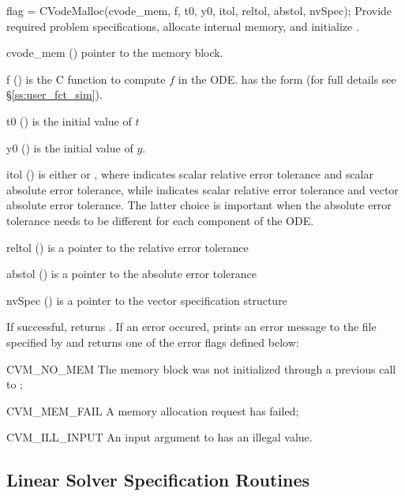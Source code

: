 {
flag = CVodeMalloc(cvode\_mem, f, t0, y0, itol, reltol, abstol, nvSpec);
}
{
  Provide required problem specifications, allocate internal memory,
  and initialize {\cvodes}.
}
{
  \begin{args}[abstol]
  \item[cvode\_mem] ()
    pointer to the {\cvodes} memory block.
  \item[f] ()
    is the C function to compute $f$ in the ODE.  has the form 
     (for full details see \S\ref{ss:user_fct_sim}).
  \item[t0] ()
    is the initial value of $t$
  \item[y0] ()
    is the initial value of $y$. 
  \item[itol] () 
    is either  or , where  indicates scalar relative error 
    tolerance and scalar absolute error tolerance, while  indicates scalar
    relative error tolerance and vector absolute error tolerance. 
    The latter choice is important when the absolute error tolerance needs to
    be different for each component of the ODE. 
  \item[reltol] ()
    is a pointer to the relative error tolerance
  \item[abstol] ()
    is a pointer to the absolute error tolerance
  \item[nvSpec] ()
    is a pointer to the vector specification structure
  \end{args}
}
{
  If successful,  returns .
  If an error occured,  prints an error message to the
  file specified by  and returns one of the error flags
  defined below:
  \begin{args}
  \item[CVM\_NO\_MEM] 
    The {\cvodes} memory block was not initialized through a previous call to ;
  \item[CVM\_MEM\_FAIL] 
    A memory allocation request has failed;
  \item[CVM\_ILL\_INPUT] 
    An input argument to  has an illegal value.
  \end{args}
}
{}

\subsection{Linear Solver Specification Routines}\label{sss:lin_solv_init}

